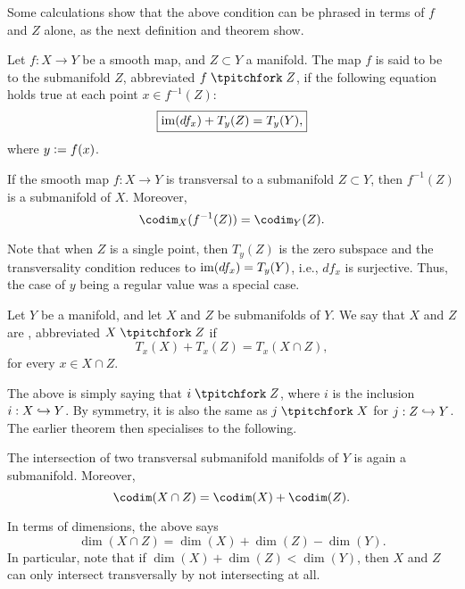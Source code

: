 Some calculations show that the above condition can be phrased in terms of $f$ and $Z$ alone, as the next definition and theorem show.

\begin{defn}
	Let $f : X \to Y$ be a smooth map, and $Z \subset Y$ a manifold. The map $f$ is said to be  to the submanifold $Z$, abbreviated $f \trans Z$, if the following equation holds true at each point $x \in f^{-1}(Z)$:
	\begin{equation*} 
		\boxed{\operatorname{im}(df_{x}) + T_{y}(Z) = T_{y}(Y),}
	\end{equation*}
	where $y \vcentcolon= f(x)$.
\end{defn}

\begin{thm}
	If the smooth map $f : X \to Y$ is transversal to a submanifold $Z \subset Y$, then $f^{-1}(Z)$ is a submanifold of $X$. Moreover,
	\begin{equation*} 
		\codim_{X}(f^{-1}(Z)) = \codim_{Y}(Z).
	\end{equation*}
\end{thm}

Note that when $Z$ is a single point, then $T_{y}(Z)$ is the zero subspace and the transversality condition reduces to $\operatorname{im}(df_{x}) = T_{y}(Y)$, i.e., $df_{x}$ is surjective. Thus, the case of $y$ being a regular value was a special case.

\begin{defn}
	Let $Y$ be a manifold, and let $X$ and $Z$ be submanifolds of $Y$. We say that $X$ and $Z$ are , abbreviated $X \trans Z$ if
	\begin{equation*} 
		\boxed{T_{x}(X) + T_{x}(Z) = T_{x}(X \cap Z),}
	\end{equation*}
	for every $x \in X \cap Z$.
\end{defn}
The above is simply saying that $i \trans Z$, where $i$ is the inclusion $i : X \hookrightarrow Y$. By symmetry, it is also the same as $j \trans X$ for $j : Z \hookrightarrow Y$. The earlier theorem then specialises to the following.

\begin{thm}
	The intersection of two transversal submanifold manifolds of $Y$ is again a submanifold. Moreover,
	\begin{equation*} 
		\codim(X \cap Z) = \codim(X) + \codim(Z).
	\end{equation*}
\end{thm}
In terms of dimensions, the above says
\begin{equation*} 
	\dim(X \cap Z) = \dim(X) + \dim(Z) - \dim(Y).
\end{equation*}
In particular, note that if $\dim(X) + \dim(Z) < \dim(Y)$, then $X$ and $Z$ can only intersect transversally by not intersecting at all. 

